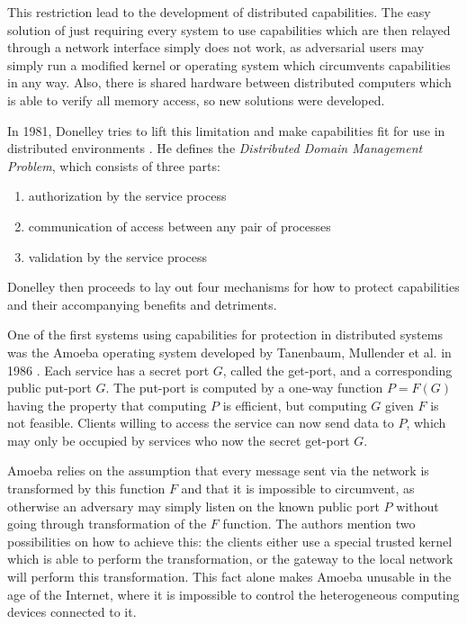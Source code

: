 This restriction lead to the development of distributed capabilities.
The easy solution of just requiring every system to use capabilities which are then relayed through a network interface simply does not work, as adversarial users may simply run a modified kernel or operating system which circumvents capabilities in any way.
Also, there is shared hardware between distributed computers which is able to verify all memory access, so new solutions were developed.

In 1981, Donelley tries to lift this limitation and make capabilities fit for use in distributed environments \cite{donnelley1981managing}.
He defines the \emph{Distributed Domain Management Problem}, which consists of three parts:
\begin{enumerate}
    \item authorization by the service process
    \item communication of access between any pair of processes
    \item validation by the service process
\end{enumerate}
Donelley then proceeds to lay out four mechanisms for how to protect capabilities and their accompanying benefits and detriments.


One of the first systems using capabilities for protection in distributed systems was the Amoeba operating system developed by Tanenbaum, Mullender et al. in 1986 \cite{tanenbaum1986using,mullender1990amoeba}.
Each service has a secret port $G$, called the get-port, and a corresponding public put-port $G$.
The put-port is computed by a one-way function $P = F(G)$ having the property that computing $P$ is efficient, but computing $G$ given $F$ is not feasible.
Clients willing to access the service can now send data to $P$, which may only be occupied by services who now the secret get-port $G$.

Amoeba relies on the assumption that every message sent via the network is transformed by this function $F$ and that it is impossible to circumvent, as otherwise an adversary may simply listen on the known public port $P$ without going through transformation of the $F$ function.
The authors mention two possibilities on how to achieve this: the clients either use a special trusted kernel which is able to perform the transformation, or the gateway to the local network will perform this transformation.
This fact alone makes Amoeba unusable in the age of the Internet, where it is impossible to control the heterogeneous computing devices connected to it.


